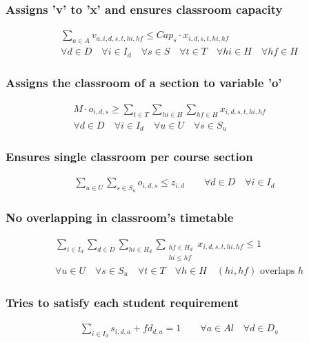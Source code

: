 \subsubsection{Assigns 'v' to 'x' and ensures classroom capacity}
\begin{eqnarray}
\sum\limits_{a \in A} v_{a,i,d,s,t,hi,hf}  \le Cap_{s} \cdot x_{i,d,s,t,hi,hf} \nonumber \qquad 
\\
\forall d \in D \quad
\forall i \in I_{d} \quad 
\forall s \in S \quad
\forall t \in T \quad 
\forall hi \in H \quad 
\forall hf \in H
\end{eqnarray}

\subsubsection{Assigns the classroom of a section to variable 'o'}
\begin{eqnarray}
M \cdot o_{i,d,s}  \geq \sum\limits_{t \in T}\sum\limits_{hi \in H}\sum\limits_{hf \in H} x_{i,d,s,t,hi,hf}  \nonumber \qquad 
\\
\forall d \in D \quad
\forall i \in I_{d} \quad
\forall u \in U \quad
\forall s \in S_{u} \quad
\end{eqnarray}

\subsubsection{Ensures single classroom per course section}
\begin{eqnarray}
\sum\limits_{u \in U} \sum\limits_{s \in S_{u}} o_{i,d,s}  \leq  z_{i,d}  \nonumber \qquad 
\forall d \in D \quad
\forall i \in I_{d} \quad
\end{eqnarray}

\subsubsection{No overlapping in classroom's timetable}
\begin{eqnarray}
\sum\limits_{i \in I_{d}} \sum\limits_{d \in D} \sum\limits_{hi \in H_{d}} \sum_{\substack {hf \in H_{d} \\ hi\le hf}} x_{i,d,s,t,hi,hf}  \leq  1  \nonumber \qquad 
\\
\forall u \in U \quad
\forall s \in S_{u} \quad
\forall t \in T \quad
\forall h \in H \quad (hi,hf)\text{ overlaps }h
\end{eqnarray}

\subsubsection{Tries to satisfy each student requirement}
\begin{eqnarray}
\sum\limits_{i \in I_{d}} s_{i,d,a} + fd_{d,a} = 1  \nonumber \qquad 
\forall a \in Al \quad
\forall d \in D_{a}
\end{eqnarray}

